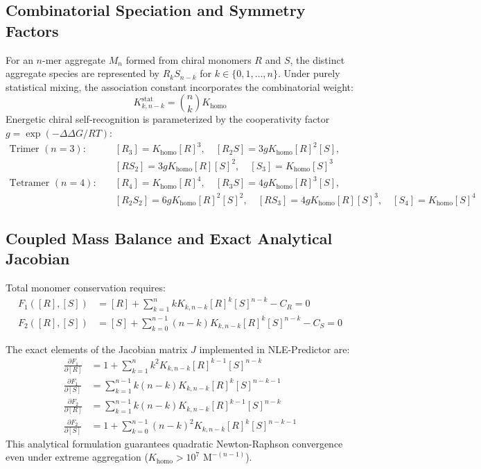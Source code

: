 \documentclass[11pt,a4paper]{article}
\begin{document}
\subsection{Combinatorial Speciation and Symmetry Factors}
For an $n$-mer aggregate $M_n$ formed from chiral monomers $R$ and $S$, the distinct aggregate species are represented by $R_k S_{n-k}$ for $k \in \{0, 1, \dots, n\}$. Under purely statistical mixing, the association constant incorporates the combinatorial weight:
\begin{equation}
K_{k, n-k}^{\text{stat}} = \binom{n}{k} K_{\text{homo}}
\end{equation}
Energetic chiral self-recognition is parameterized by the cooperativity factor $g = \exp(-\Delta\Delta G / RT)$:
\begin{align}
\text{Trimer } (n=3): \quad &[R_3] = K_{\text{homo}} [R]^3, \quad [R_2 S] = 3 g K_{\text{homo}} [R]^2 [S], \nonumber\\
&[R S_2] = 3 g K_{\text{homo}} [R] [S]^2, \quad [S_3] = K_{\text{homo}} [S]^3 \\[6pt]
\text{Tetramer } (n=4): \quad &[R_4] = K_{\text{homo}} [R]^4, \quad [R_3 S] = 4 g K_{\text{homo}} [R]^3 [S], \nonumber\\
&[R_2 S_2] = 6 g K_{\text{homo}} [R]^2 [S]^2, \quad [R S_3] = 4 g K_{\text{homo}} [R] [S]^3, \quad [S_4] = K_{\text{homo}} [S]^4
\end{align}

\subsection{Coupled Mass Balance and Exact Analytical Jacobian}
Total monomer conservation requires:
\begin{align}
F_1([R], [S]) &= [R] + \sum_{k=1}^n k K_{k, n-k} [R]^k [S]^{n-k} - C_R = 0 \\
F_2([R], [S]) &= [S] + \sum_{k=0}^{n-1} (n-k) K_{k, n-k} [R]^k [S]^{n-k} - C_S = 0
\end{align}

The exact elements of the Jacobian matrix $J$ implemented in NLE-Predictor are:
\begin{align}
\frac{\partial F_1}{\partial [R]} &= 1 + \sum_{k=1}^n k^2 K_{k, n-k} [R]^{k-1} [S]^{n-k} \\[4pt]
\frac{\partial F_1}{\partial [S]} &= \sum_{k=1}^{n-1} k (n-k) K_{k, n-k} [R]^k [S]^{n-k-1} \\[4pt]
\frac{\partial F_2}{\partial [R]} &= \sum_{k=1}^{n-1} k (n-k) K_{k, n-k} [R]^{k-1} [S]^{n-k} \\[4pt]
\frac{\partial F_2}{\partial [S]} &= 1 + \sum_{k=0}^{n-1} (n-k)^2 K_{k, n-k} [R]^k [S]^{n-k-1}
\end{align}
This analytical formulation guarantees quadratic Newton-Raphson convergence even under extreme aggregation ($K_{\text{homo}} > 10^7\text{ M}^{-(n-1)}$).
\end{document}
